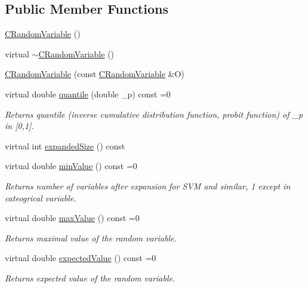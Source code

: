 \subsection*{Public Member Functions}
\begin{DoxyCompactItemize}
\item 
\hyperlink{class_c_random_variable_a03e9f9f26cf0c15a1b0f1b46ef83bc40}{C\-Random\-Variable} ()
\item 
virtual \hyperlink{class_c_random_variable_a3131305da7abf87d2cb182a70815d4bf}{$\sim$\-C\-Random\-Variable} ()
\item 
\hyperlink{class_c_random_variable_a92d57bfc26847eb75a8526993a5b4f9f}{C\-Random\-Variable} (const \hyperlink{class_c_random_variable}{C\-Random\-Variable} \&O)
\item 
virtual double \hyperlink{class_c_random_variable_aad8f00777fdad0e7e1ad29c9ea620ff2}{quantile} (double \-\_\-p) const =0
\begin{DoxyCompactList}\small\item\em Returns quantile (inverse cumulative distribution function, probit function) of \-\_\-p in \mbox{[}0,1\mbox{]}. \end{DoxyCompactList}\item 
virtual int \hyperlink{class_c_random_variable_ada091c2895cf25a75ac8aacecb5da47f}{expanded\-Size} () const 
\item 
virtual double \hyperlink{class_c_random_variable_a233ddd2eedb51b09a04a8c330646f356}{min\-Value} () const =0
\begin{DoxyCompactList}\small\item\em Returns number of variables after expansion for S\-V\-M and similar, 1 except in cateogrical variable. \end{DoxyCompactList}\item 
virtual double \hyperlink{class_c_random_variable_a48a5e98363d866f1f46568ed658479ad}{max\-Value} () const =0
\begin{DoxyCompactList}\small\item\em Returns maximal value of the random variable. \end{DoxyCompactList}\item 
virtual double \hyperlink{class_c_random_variable_a6e5490d17f2b6abcf9922c8b1bd6d4ed}{expected\-Value} () const =0
\begin{DoxyCompactList}\small\item\em Returns expected value of the random variable. \end{DoxyCompactList}\item 

\end{DoxyCompactItemize}
